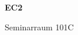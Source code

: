 \documentclass[a4paper]{article}
\begin{document}
\printGenericVSLHeader
\begin{center}
\begin{vsltext}{3cm}{4cm}

   \vspace{0.5cm} 

    \textbf{EC2} 

    \vspace{1.5cm}

    Seminarraum 101C

\end{vsltext}

\end{center}
\end{document}
